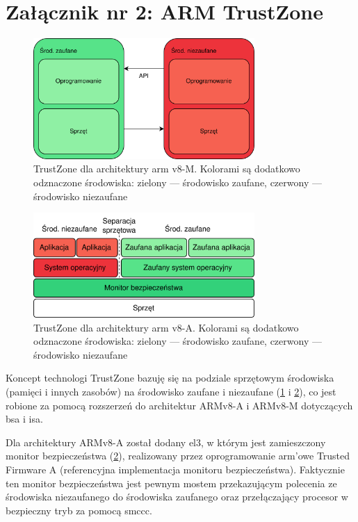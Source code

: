 \documentclass[../main]{subfiles}
\begin{document}
\section*{Załącznik nr 2: ARM TrustZone}\label{sec:zalacznik-2}
\begin{figure}
    \centering
    \includegraphics[width=0.75\textwidth]{Images/trustzone-m.png}
    \caption{TrustZone dla architektury \acrshort{arm} v8-M. Kolorami są dodatkowo odznaczone środowiska: zielony — środowisko zaufane, czerwony — środowisko niezaufane}
    \label{fig:trustzone-m}
\end{figure}
\begin{figure}
    \centering
    \includegraphics[width=0.75\textwidth]{Images/trustzone-a.png}
    \caption{TrustZone dla architektury \acrshort{arm} v8-A. Kolorami są dodatkowo odznaczone środowiska: zielony — środowisko zaufane, czerwony — środowisko niezaufane}
    \label{fig:trustzone-a}
\end{figure}

Koncept technologi TrustZone bazuję się na podziale sprzętowym środowiska (pamięci i innych zasobów) na
środowisko zaufane i niezaufane (\cref{fig:trustzone-m} i
\cref{fig:trustzone-a}), co jest robione za pomocą rozszerzeń do architektur ARMv8-A i
ARMv8-M dotyczących \acrshort{bsa} i \acrshort{isa}.

Dla architektury ARMv8-A został dodany \acrshort{el}3, w którym jest zamieszczony monitor bezpieczeństwa
(\cref{fig:trustzone-a}), realizowany przez oprogramowanie \acrshort{arm}'owe Trusted
Firmware A (referencyjna implementacja monitoru bezpieczeństwa). Faktycznie ten monitor bezpieczeństwa
jest pewnym mostem przekazującym polecenia ze środowiska niezaufanego do środowiska zaufanego oraz
przełączający procesor w bezpieczny tryb za pomocą \acrshort{smccc}.
\cite{smccc}\cite{trustzoneaarch64} %
\end{document}
